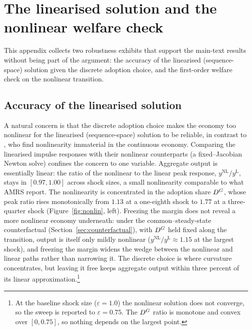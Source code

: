 \section{The linearised solution and the nonlinear welfare check}\label{app:nonlin}

This appendix collects two robustness exhibits that support the main-text
results without being part of the argument: the accuracy of the linearised
(sequence-space) solution given the discrete adoption choice, and the
first-order welfare check on the nonlinear transition.

\subsection{Accuracy of the linearised solution}
\label{sec:nonlin}

A natural concern is that the discrete adoption choice makes the economy too
nonlinear for the linearised (sequence-space) solution to be reliable, in
contrast to \citet{auclert2023energy}, who find nonlinearity immaterial in the continuous
economy. Comparing the linearised impulse responses with their nonlinear
counterparts (a fixed--Jacobian Newton solve) confines the concern to one
variable. Aggregate output is essentially linear: the ratio of the nonlinear to
the linear peak response, $y^{\mathrm{NL}}/y^{\mathrm{L}}$, stays in $[0.97,1.00]$
across shock sizes, a small nonlinearity comparable to what AMRS report. The
nonlinearity is concentrated in the adoption share $D^{G}$, whose peak ratio rises
monotonically from $1.13$ at a one-eighth shock to $1.77$ at a three-quarter
shock (Figure~\ref{fig:nonlin}, left). Freezing the margin does not reveal a more
nonlinear economy underneath: under the common--steady-state counterfactual
(Section~\ref{sec:counterfactual}), with $D^{G}$ held fixed along the transition,
output is itself only mildly nonlinear ($y^{\mathrm{NL}}/y^{\mathrm{L}}\approx
1.15$ at the largest shock), and freezing the margin widens the wedge between the nonlinear and linear paths
rather than narrowing it. The discrete choice is where curvature concentrates, but leaving it free keeps aggregate output within
three percent of its linear approximation.\footnote{At the baseline shock size
($\varepsilon=1.0$) the nonlinear solution does not converge, so the sweep is
reported to $\varepsilon=0.75$. The $D^{G}$
ratio is monotone and convex over $[0,0.75]$, so nothing depends on the largest
point.}


